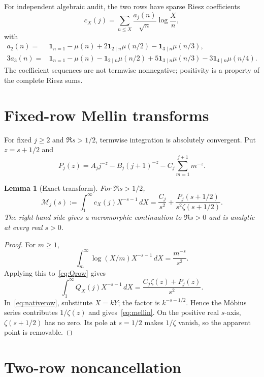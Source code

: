 \documentclass[11pt]{article}
\newtheorem{lemma}[theorem]{Lemma}
\newcommand{\one}{\mathbf 1}
\newcommand{\Mell}{\mathcal M}
\begin{document}
For independent algebraic audit, the two rows have sparse Riesz coefficients
\begin{equation}
 c_X(j)=\sum_{n\le X}\frac{a_j(n)}{\sqrt n}\log\frac Xn,
\end{equation}
with
\begin{align}
 a_2(n)={}&\one_{n=1}-\mu(n)
 +2\one_{2\mid n}\mu(n/2)-\one_{3\mid n}\mu(n/3),\label{eq:a2}\\
 3a_3(n)={}&\one_{n=1}-\mu(n)-\one_{2\mid n}\mu(n/2)
 +5\one_{3\mid n}\mu(n/3)-3\one_{4\mid n}\mu(n/4).
\label{eq:a3}
\end{align}
The coefficient sequences are not termwise nonnegative; positivity is a property of the complete Riesz sums.

\section{Fixed-row Mellin transforms}
\label{sec:mellin}

For fixed $j\ge2$ and $\Re s>1/2$, termwise integration is absolutely convergent.  Put $z=s+1/2$ and
\begin{equation}
 P_j(z)=A_jj^{-z}-B_j(j+1)^{-z}-C_j\sum_{m=1}^{j+1}m^{-z}.
\label{eq:Pj}
\end{equation}

\begin{lemma}[Exact transform]
\label{lem:mellin}
For $\Re s>1/2$,
\begin{equation}
 \Mell_j(s):=\int_1^\infty c_X(j)X^{-s-1}\,dX
 =\frac{C_j}{s^2}+\frac{P_j(s+1/2)}{s^2\zeta(s+1/2)}.
\label{eq:mellin}
\end{equation}
The right-hand side gives a meromorphic continuation to $\Re s>0$ and is analytic at every real $s>0$.
\end{lemma}
\begin{proof}
For $m\ge1$,
\[
 \int_m^\infty \log(X/m)X^{-s-1}\,dX=\frac{m^{-s}}{s^2}.
\]
Applying this to~\eqref{eq:Qrow} gives
\[
 \int_1^\infty Q_X(j)X^{-s-1}\,dX
 =\frac{C_j\zeta(z)+P_j(z)}{s^2}.
\]
In~\eqref{eq:nativerow}, substitute $X=kY$; the factor is $k^{-s-1/2}$.  Hence the M\"obius series contributes $1/\zeta(z)$ and gives~\eqref{eq:mellin}.  On the positive real $s$-axis, $\zeta(s+1/2)$ has no zero.  Its pole at $s=1/2$ makes $1/\zeta$ vanish, so the apparent point is removable.
\end{proof}

\section{Two-row noncancellation}
\label{sec:noncancel}
\end{document}
